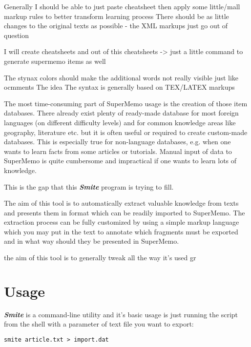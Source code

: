 \documentclass[a4paper,11pt]{article}
\newcommand{\smite}{\emph{\textbf{Smite{}}}}
\begin{document}
Generally I should be able to just paste cheatsheet then apply some little/mall
markup rules to better transform learning process There should be as little
changes to the original texts as possible - the XML markups just go out of
question

I will create cheatsheets and out of this cheatsheets -> just a little command
to generate supermemo items as well

The stynax colors should make the additional words not really visible just like
ocmments The idea The syntax is generally based on TEX/LATEX markups


The most time-consuming part of SuperMemo usage is the creation of those item
databases. There already exist plenty of ready-made database for most foreign
languages (on different difficulty levels) and for common knowledge areas like
geography, literature etc. but it is often useful or required to create
custom-made databases. This is especially true for non-language databases, e.g.
when one wants to learn facts from some articles or tutorials. Manual input of
data to SuperMemo is quite cumbersome and impractical if one wants to learn
lots of knowledge.

This is the gap that this \smite{} program is trying to fill.

The aim of this tool is to automatically extract valuable knowledge from texts
and presents them in format which can be readily imported to SuperMemo. The
extraction process can be fully customized by using a simple markup language
which you may put in the text to annotate which fragments must be exported and
in what way should they be presented in SuperMemo.


the aim of this tool is to generally tweak all the way it's used gr











\section{Usage}

\smite{} is a command-line utility and it's basic usage is just running the
script from the shell with a parameter of text file you want to export:
\begin{verbatim}
smite article.txt > import.dat
\end{verbatim}
\end{document}
